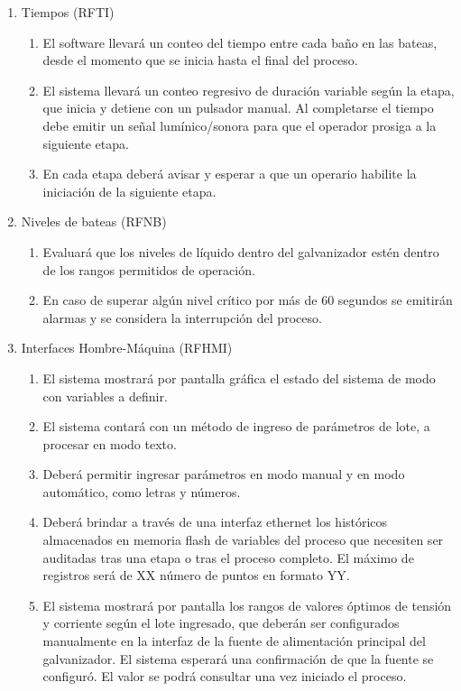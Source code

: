 \begin{enumerate}
\begin{enumerate}
\item Tiempos (RFTI)
\begin{enumerate}
\item El software llevará un conteo del tiempo entre cada baño en las bateas, desde el momento que se inicia hasta el final del proceso.
\item El sistema llevará un conteo regresivo de duración variable según la etapa, que inicia y detiene con un pulsador manual. Al completarse el tiempo debe emitir un señal lumínico/sonora para que el operador prosiga a la siguiente etapa.
\item En cada etapa deberá avisar y esperar a que un operario habilite la iniciación de la siguiente etapa.
\end{enumerate}

\item Niveles de bateas (RFNB)	
\begin{enumerate}
\item Evaluará que los niveles de líquido dentro del galvanizador estén dentro de los rangos permitidos de operación.
\item En caso de superar algún nivel crítico por más de 60 segundos se emitirán alarmas y se considera la interrupción del proceso.
\end{enumerate}

\item Interfaces Hombre-Máquina (RFHMI) \footnotemark
{}
\begin{enumerate}
\item El sistema mostrará por pantalla gráfica el estado del sistema de modo con variables a definir.
\item El sistema contará con un método de ingreso de parámetros de lote, a procesar en modo texto.
\item Deberá permitir ingresar parámetros en modo manual y en modo automático, como letras y números.
\item Deberá brindar a través de una interfaz ethernet los históricos almacenados en memoria flash de variables del proceso que necesiten ser auditadas tras una etapa o tras el proceso completo. El máximo de registros será de XX número de puntos en
formato YY. \footnotemark
\item El sistema mostrará por pantalla los rangos de valores óptimos de tensión y corriente según el lote ingresado, que deberán ser configurados manualmente en la interfaz de la fuente de alimentación principal del galvanizador. El sistema esperará una confirmación de que la fuente se configuró. El valor se podrá consultar una vez iniciado el proceso.
\end{enumerate}


\end{enumerate}
\end{enumerate}
